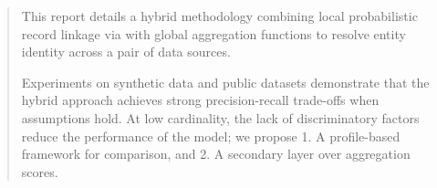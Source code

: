 \begin{abstract}
	This report details a hybrid methodology combining local probabilistic record linkage via \splink{} with global aggregation functions to resolve entity identity across a pair of data sources.

	Experiments on synthetic data and public datasets demonstrate that the hybrid approach achieves strong precision-recall trade-offs when assumptions hold. At low cardinality, the lack of discriminatory factors reduce the performance of the model; we propose 1. A profile-based framework for comparison, and 2. A secondary \splink{} layer over aggregation scores.
\end{abstract}
